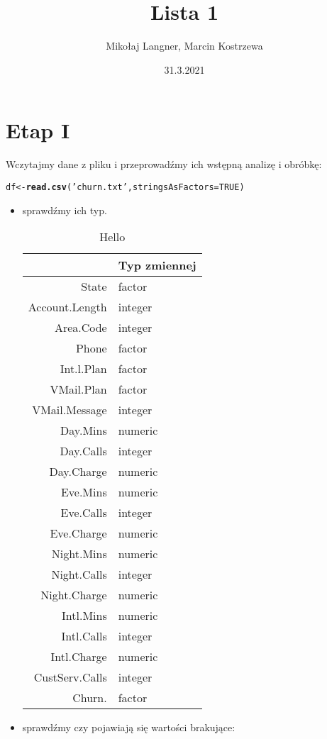 \documentclass{article}\usepackage[]{graphicx}\usepackage[]{color}
\title{Lista 1}
\author{Mikołaj Langner, Marcin Kostrzewa}
\date{31.3.2021}
\makeatletter
\newcommand{\hlnum}[1]{\textcolor[rgb]{0.686,0.059,0.569}{#1}}%
\newcommand{\hlstr}[1]{\textcolor[rgb]{0.192,0.494,0.8}{#1}}%
\newcommand{\hlstd}[1]{\textcolor[rgb]{0.345,0.345,0.345}{#1}}%
\newcommand{\hlkwb}[1]{\textcolor[rgb]{0.69,0.353,0.396}{#1}}%
\newcommand{\hlkwc}[1]{\textcolor[rgb]{0.333,0.667,0.333}{#1}}%
\newcommand{\hlkwd}[1]{\textcolor[rgb]{0.737,0.353,0.396}{\textbf{#1}}}%
\newenvironment{kframe}{%
 \def\at@end@of@kframe{}%
 \ifinner\ifhmode%
  \def\at@end@of@kframe{\end{minipage}}%
  \begin{minipage}{\columnwidth}%
 \fi\fi%
 \def\FrameCommand##1{\hskip\@totalleftmargin \hskip-\fboxsep
 \colorbox{shadecolor}{##1}\hskip-\fboxsep
     \hskip-\linewidth \hskip-\@totalleftmargin \hskip\columnwidth}%
 \MakeFramed {\advance\hsize-\width
   \@totalleftmargin\z@ \linewidth\hsize
   \@setminipage}}%
 {\par\unskip\endMakeFramed%
 \at@end@of@kframe}
\newenvironment{knitrout}{}{} %
\makeatother
\begin{document}
\maketitle

\section{Etap I}
Wczytajmy dane z pliku i przeprowadźmy ich wstępną analizę i obróbkę:
\begin{knitrout}
\color{fgcolor}\begin{kframe}
\begin{alltt}
\hlstd{df} \hlkwb{<-} \hlkwd{read.csv}\hlstd{(}\hlstr{'churn.txt'}\hlstd{,} \hlkwc{stringsAsFactors} \hlstd{=} \hlnum{TRUE}\hlstd{)}
\end{alltt}
\end{kframe}
\end{knitrout}

\begin{itemize}
\item sprawdźmy ich typ.
\begin{table}[H]
\centering
\begin{tabular}{rl}
  \hline
 & Typ zmiennej \\ 
  \hline
State & factor \\ 
  Account.Length & integer \\ 
  Area.Code & integer \\ 
  Phone & factor \\ 
  Int.l.Plan & factor \\ 
  VMail.Plan & factor \\ 
  VMail.Message & integer \\ 
  Day.Mins & numeric \\ 
  Day.Calls & integer \\ 
  Day.Charge & numeric \\ 
  Eve.Mins & numeric \\ 
  Eve.Calls & integer \\ 
  Eve.Charge & numeric \\ 
  Night.Mins & numeric \\ 
  Night.Calls & integer \\ 
  Night.Charge & numeric \\ 
  Intl.Mins & numeric \\ 
  Intl.Calls & integer \\ 
  Intl.Charge & numeric \\ 
  CustServ.Calls & integer \\ 
  Churn. & factor \\ 
   \hline
\end{tabular}
\caption{Hello} 
\label{tab:tabela1}
\end{table}


\item sprawdźmy czy pojawiają się wartości brakujące:
\end{itemize}
\end{document}
